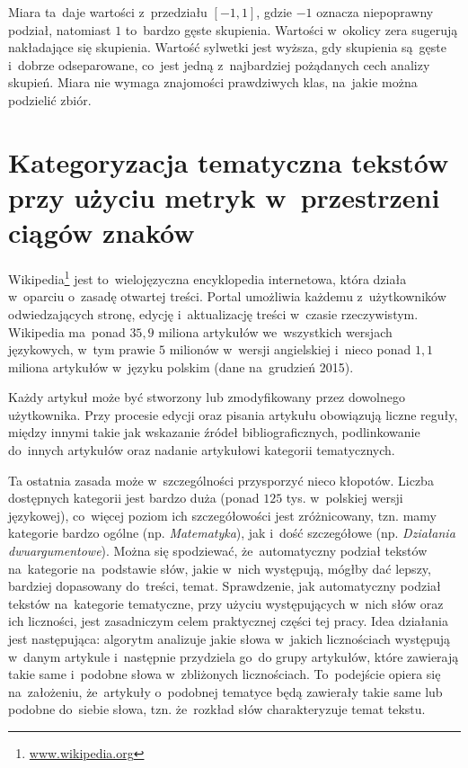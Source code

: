\documentclass{praca1}
\begin{document}
Miara ta~daje wartości z~przedziału $[-1, 1]$, gdzie $-1$ oznacza niepoprawny podział, natomiast $1$ to~bardzo gęste skupienia. Wartości w~okolicy zera sugerują nakładające się skupienia. Wartość sylwetki jest wyższa, gdy skupienia są~gęste i~dobrze odseparowane, co~jest jedną z~najbardziej pożądanych cech analizy skupień. Miara nie wymaga znajomości prawdziwych klas, na~jakie można podzielić zbiór.



\chapter{Kategoryzacja tematyczna tekstów przy użyciu metryk w~przestrzeni ciągów znaków}

Wikipedia\footnote{\url{www.wikipedia.org}} jest to~wielojęzyczna encyklopedia internetowa, która działa w~oparciu o~zasadę otwartej treści. Portal umożliwia każdemu z~użytkowników odwiedzających stronę, edycję i~aktualizację treści w~czasie rzeczywistym. Wikipedia ma~ponad $35{,}9$ miliona artykułów we~wszystkich wersjach językowych, w~tym prawie $5$ milionów w~wersji angielskiej i~nieco ponad $1{,}1$ miliona artykułów w~języku polskim (dane na~grudzień 2015).

Każdy artykuł może być stworzony lub zmodyfikowany przez dowolnego użytkownika. Przy procesie edycji oraz pisania artykułu obowiązują liczne reguły, między innymi takie jak wskazanie źródeł bibliograficznych, podlinkowanie do~innych artykułów oraz nadanie artykułowi kategorii tematycznych. 

Ta ostatnia zasada może w~szczególności przysporzyć nieco kłopotów. Liczba dostępnych kategorii jest bardzo duża (ponad $125$ tys. w~polskiej wersji językowej), co~więcej poziom ich szczegółowości jest zróżnicowany, tzn. mamy kategorie bardzo ogólne (np. \emph{Matematyka}), jak i~dość szczegółowe (np. \emph{Działania dwuargumentowe}). Można się spodziewać, że~automatyczny podział tekstów na~kategorie na~podstawie słów, jakie w~nich występują, mógłby dać lepszy, bardziej dopasowany do~treści, temat. Sprawdzenie, jak automatyczny podział tekstów na~kategorie tematyczne, przy użyciu występujących w~nich słów oraz ich liczności, jest zasadniczym celem praktycznej części tej pracy. Idea działania jest następująca: algorytm analizuje jakie słowa w~jakich licznościach występują w~danym artykule i~następnie przydziela go~do grupy artykułów, które zawierają takie same i~podobne słowa w~zbliżonych licznościach. To~podejście opiera się na~założeniu, że~artykuły o~podobnej tematyce będą zawierały takie same lub podobne do~siebie słowa, tzn. że~rozkład słów charakteryzuje temat tekstu.
\end{document}
